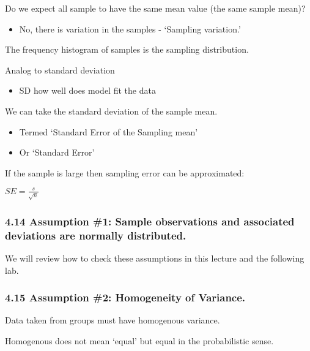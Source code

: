 \documentclass[]{article}
\providecommand{\tightlist}{%
  \setlength{\itemsep}{0pt}\setlength{\parskip}{0pt}}
\begin{document}
Do we expect all sample to have the same mean value (the same sample
mean)?

\begin{itemize}
\tightlist
\item
  No, there is variation in the samples - `Sampling variation.'
\end{itemize}

The frequency histogram of samples is the sampling distribution.

Analog to standard deviation

\begin{itemize}
\tightlist
\item
  SD how well does model fit the data
\end{itemize}

We can take the standard deviation of the sample mean.

\begin{itemize}
\tightlist
\item
  Termed `Standard Error of the Sampling mean'
\item
  Or `Standard Error'
\end{itemize}

If the sample is large then sampling error can be approximated:

\(SE=\frac{s}{\sqrt n}\)

\hypertarget{assumption-1-sample-observations-and-associated-deviations-are-normally-distributed.}{%
\subsubsection{4.14 Assumption \#1: Sample observations and associated
deviations are normally
distributed.}\label{assumption-1-sample-observations-and-associated-deviations-are-normally-distributed.}}

We will review how to check these assumptions in this lecture and the
following lab.

\hypertarget{assumption-2-homogeneity-of-variance.}{%
\subsubsection{4.15 Assumption \#2: Homogeneity of
Variance.}\label{assumption-2-homogeneity-of-variance.}}

Data taken from groups must have homogenous variance.

Homogenous does not mean `equal' but equal in the probabilistic sense.
\end{document}

